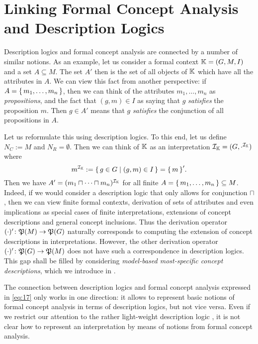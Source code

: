 \section{Linking Formal Concept Analysis and Description Logics}
\label{sec:motivation}

Description logics and formal concept analysis are connected by a number of similar
notions.  As an example, let us consider a formal context ${\mathbb{K}} = (G, M, I)$ and a set
$A \subseteq M$.  The set $A'$ then is the set of all objects of ${\mathbb{K}}$ which have all
the attributes in $A$.  We can view this fact from another perspective: if $A = {\{\, m_1,
  \dots, m_n \,\}}$, then we can think of the attributes $m_1, \dots, m_n$ as
\emph{propositions}, and the fact that $(g, m) \in I$ as saying that $g$ \emph{satisfies}
the proposition $m$.  Then $g \in A'$ means that $g$ \emph{satisfies} the conjunction of
all propositions in $A$.

Let us reformulate this using description logics.  To this end, let us define $N_C := M$
and $N_R = \emptyset$.  Then we can think of ${\mathbb{K}}$ as an interpretation
$\mathcal{I}_{{\mathbb{K}}} = (G, \cdot^{\mathcal{I}_{{\mathbb{K}}}})$ where
\begin{equation}
  \label{eq:17}
  m^{\mathcal{I}_{{\mathbb{K}}}} := {\{\, g \in G \mid (g, m) \in I \,\}} = {\{\, m \,\}}'.
\end{equation}
Then we have $A' = (m_1 \sqcap \dots \sqcap m_n)^{\mathcal{I}_{{\mathbb{K}}}}$ for all finite $A
= {\{\, m_1, \dots, m_n \,\}} \subseteq M$.  Indeed, if we would consider a description logic
that only allows for conjunction $\sqcap$, then we can view finite formal contexts,
derivation of sets of attributes and even implications as special cases of finite
interpretations, extensions of concept descriptions and general concept inclusions.  Thus
the derivation operator $(\cdot)' \colon {\ensuremath{\mathfrak{P}(M)}} \to {\ensuremath{\mathfrak{P}(G)}}$ naturally
corresponds to computing the extension of concept descriptions in interpretations.
However, the other derivation operator $(\cdot)' \colon {\ensuremath{\mathfrak{P}(G)}} \to {\ensuremath{\mathfrak{P}(M)}}$ does
not have such a correspondence in description logics.  This gap shall be filled by
considering \emph{model-based most-specific concept descriptions}, which we introduce in
.

The connection between description logics and formal concept analysis expressed in
\eqref{eq:17} only works in one direction: it allows to represent basic notions of formal
concept analysis in terms of description logics, but not vice versa.  Even if we restrict
our attention to the rather light-weight description logic \ELbot, it is not clear how to
represent an interpretation by means of notions from formal concept analysis.

